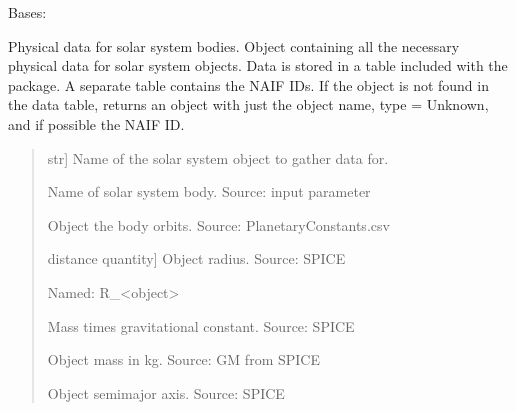 \documentclass[letterpaper,10pt,english]{sphinxmanual}
\begin{document}
\begin{fulllineitems}
\label{\detokenize{nexoclom2/nexoclom2.solarsystem.SSObject:nexoclom2.solarsystem.SSObject.SSObject}}
\pysigstartsignatures
\pysiglinewithargsret
{}
{}
{}
\pysigstopsignatures
\sphinxAtStartPar
Bases: 

\sphinxAtStartPar
Physical data for solar system bodies.
Object containing all the necessary physical data for solar system objects.
Data is stored in a table included with the package. A separate table
contains the NAIF IDs. If the object is not found in the data table, returns
an object with just the object name, type = Unknown, and if possible the
NAIF ID.
\begin{quote}\begin{description}
\begin{description}
\sphinxlineitem{\sphinxstylestrong{obj}}{[}str{]}
\sphinxAtStartPar
Name of the solar system object to gather data for.

\end{description}

\begin{description}
\sphinxAtStartPar
Name of solar system body. Source: input parameter

\sphinxAtStartPar
Object the body orbits. Source: PlanetaryConstants.csv

\sphinxlineitem{\sphinxstylestrong{radius}}{[}distance quantity{]}
\sphinxAtStartPar
Object radius. Source: SPICE

\sphinxAtStartPar
Named: R\_\textless{}object\textgreater{}

\sphinxAtStartPar
Mass times gravitational constant. Source: SPICE

\sphinxAtStartPar
Object mass in kg. Source: GM from SPICE

\sphinxAtStartPar
Object semi\sphinxhyphen{}major axis. Source: SPICE


\end{description}
\end{description}
\end{quote}
\end{fulllineitems}
\end{document}
